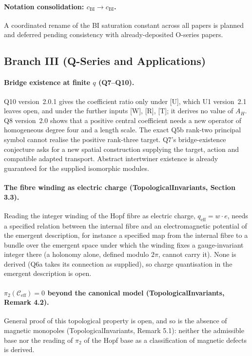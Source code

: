 \documentclass[11pt,a4paper]{article}
\begin{document}
    \paragraph{Notation consolidation: $c_{\mathrm{BI}} \to c_{\mathrm{BI}}$.}
      A coordinated rename of the BI saturation constant across all papers is planned and deferred
      pending consistency with already-deposited O-series papers.

  \subsection{Branch III (Q-Series and Applications)}

  \paragraph{Bridge existence at finite $q$ (Q7--Q10).}
    Q10 version~2.0.1 gives the coefficient ratio only under [U], which U1 version~2.1 leaves open, and under
    the further inputs [W], [R], [T]; it derives no value of $A_H$.
    Q8 version~2.0 shows that a positive central coefficient needs a new operator of homogeneous degree four
    and a length scale.
    The exact Q5b rank-two principal symbol cannot realise the positive rank-three target.
    Q7's bridge-existence conjecture asks for a new spatial construction supplying the target,
    action and compatible adapted transport.
    Abstract intertwiner existence is already guaranteed for the supplied isomorphic modules.

  \paragraph{The fibre winding as electric charge (TopologicalInvariants, Section 3.3).}
    Reading the integer winding of the Hopf fibre as electric charge, $q_{\mathrm{eff}} = w \cdot e$, needs a
    specified relation between the internal fibre and an electromagnetic potential of the emergent description,
    for instance a specified map from the internal fibre to a bundle over the emergent space under which the winding
    fixes a gauge-invariant integer there (a holonomy alone, defined modulo $2\pi$, cannot carry it).
    None is derived (Q6a takes its connection as supplied), so charge quantisation in the emergent description is
    open.

  \paragraph{$\pi_2(\mathcal{C}_{\mathrm{eff}}) = 0$ beyond the canonical model (TopologicalInvariants, Remark 4.2).}
    General proof of this topological property is open, and so is the absence of magnetic monopoles
    (TopologicalInvariants, Remark 5.1): neither the admissible base nor the reading of $\pi_2$ of the Hopf base as a
    classification of magnetic defects is derived.
\end{document}
